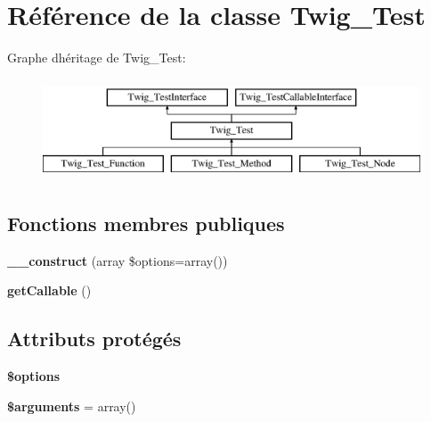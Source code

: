 \hypertarget{class_twig___test}{}\section{Référence de la classe Twig\+\_\+\+Test}
\label{class_twig___test}
Graphe d\textquotesingle{}héritage de Twig\+\_\+\+Test\+:\begin{figure}[H]
\begin{center}
\leavevmode
\includegraphics[height=3.000000cm]{class_twig___test}
\end{center}
\end{figure}
\subsection*{Fonctions membres publiques}
\begin{DoxyCompactItemize}
\item 
{\bfseries \+\_\+\+\_\+construct} (array \$options=array())\hypertarget{class_twig___test_a2d2b2afcd896367c740d1eb4b486614b}{}\label{class_twig___test_a2d2b2afcd896367c740d1eb4b486614b}

\item 
{\bfseries get\+Callable} ()\hypertarget{class_twig___test_a0be839e0782a38a172c386bd963375c9}{}\label{class_twig___test_a0be839e0782a38a172c386bd963375c9}

\end{DoxyCompactItemize}
\subsection*{Attributs protégés}
\begin{DoxyCompactItemize}
\item 
{\bfseries \$options}\hypertarget{class_twig___test_a011800c63ece4cbbfa77136a20607023}{}\label{class_twig___test_a011800c63ece4cbbfa77136a20607023}

\item 
{\bfseries \$arguments} = array()\hypertarget{class_twig___test_a61eded163d962fc248b3cf209000979b}{}\label{class_twig___test_a61eded163d962fc248b3cf209000979b}

\end{DoxyCompactItemize}


